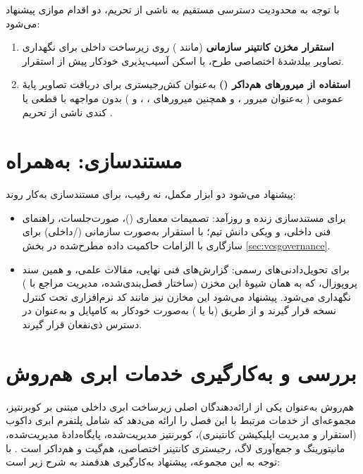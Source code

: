 با توجه به محدودیت دسترسی مستقیم به  ناشی از تحریم، دو اقدام موازی پیشنهاد می‌شود:

\begin{enumerate}
\item \textbf{استقرار مخزن کانتینر سازمانی} (مانند ) روی زیرساخت داخلی برای نگهداری تصاویر بیلدشدهٔ اختصاصی طرح، با اسکن آسیب‌پذیری خودکار پیش از استقرار.
\item \textbf{استفاده از میرورهای هم‌داکر ()} به‌عنوان کش‌رجیستری برای دریافت تصاویر پایهٔ عمومی ( به‌عنوان میرور ، و همچنین میرورهای ، ،  و ) بدون مواجهه با قطعی یا کندی ناشی از تحریم \Cite{hamdocker2026}.
\end{enumerate}

\section{مستندسازی:  به‌همراه }

پیشنهاد می‌شود دو ابزار مکمل، نه رقیب، برای مستندسازی به‌کار روند:

\begin{itemize}
\item \textbf{} برای مستندسازی زنده و روزآمد: تصمیمات معماری ()، صورت‌جلسات، راهنمای فنی داخلی، و ویکی دانش تیم؛ با استقرار به‌صورت سازمانی (/داخلی) برای سازگاری با الزامات حاکمیت داده مطرح‌شده در بخش \ref{sec:vcsgovernance}.
\item \textbf{} برای تحویل‌دادنی‌های رسمی: گزارش‌های فنی نهایی، مقالات علمی، و همین سند پروپوزال، که به همان شیوهٔ این مخزن (ساختار فصل‌بندی‌شده، مدیریت مراجع با ) نگهداری می‌شود. پیشنهاد می‌شود این مخازن  نیز مانند کد نرم‌افزاری تحت کنترل نسخه قرار گیرند و از طریق  (با  یا ) به‌صورت خودکار به  کامپایل و به‌عنوان  در دسترس ذی‌نفعان قرار گیرند.
\end{itemize}

\section{بررسی و به‌کارگیری خدمات ابری هم‌روش}

هم‌روش به‌عنوان یکی از ارائه‌دهندگان اصلی زیرساخت ابری داخلی مبتنی بر کوبرنتیز، مجموعه‌ای از خدمات مرتبط با این فصل را ارائه می‌دهد که شامل پلتفرم ابری داکوب (استقرار و مدیریت اپلیکیشن کانتینری)، کوبرنتیز مدیریت‌شده، پایگاه‌دادهٔ مدیریت‌شده، مانیتورینگ و جمع‌آوری لاگ، رجیستری کانتینر اختصاصی، هم‌گیت و هم‌داکر است \Cite{hamravesh2026}. با توجه به این مجموعه، پیشنهاد به‌کارگیری هدفمند به شرح زیر است:

